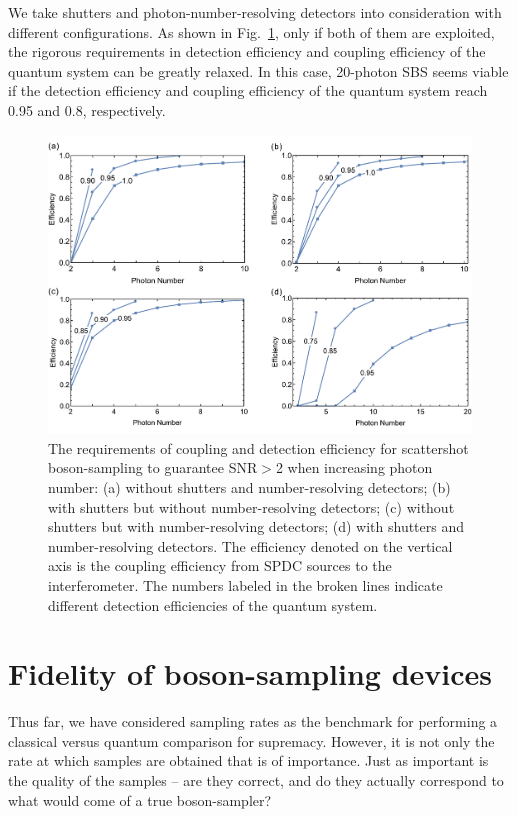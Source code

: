\documentclass[aps,rmp,twocolumn,amsmath,amssymb,nofootinbib,superscriptaddress]{revtex4}
\begin{document}
We take shutters and photon-number-resolving detectors into consideration with different configurations. As shown in Fig.~\ref{fig:SBS_eff}, only if both of them are exploited, the rigorous requirements in detection efficiency and coupling efficiency of the quantum system can be greatly relaxed. In this case, 20-photon SBS seems viable if the detection efficiency and coupling efficiency of the quantum system reach 0.95 and 0.8, respectively.

\begin{figure}[!htb]
\includegraphics[width=1.5\columnwidth]{SBS_eff}
\caption{The requirements of coupling and detection efficiency for scattershot boson-sampling to guarantee SNR$>$2 when increasing photon number: (a) without shutters and number-resolving detectors; (b) with shutters but without number-resolving detectors; (c) without shutters but with number-resolving detectors; (d) with shutters and number-resolving detectors. The efficiency denoted on the vertical axis is the coupling efficiency from SPDC sources to the interferometer. The numbers labeled in the broken lines indicate different detection efficiencies of the quantum system.} \label{fig:SBS_eff}
\end{figure}

\section{Fidelity of boson-sampling devices} \label{sec:fidelity_of_devices}

Thus far, we have considered sampling rates as the benchmark for performing a classical versus quantum comparison for supremacy. However, it is not only the rate at which samples are obtained that is of importance. Just as important is the quality of the samples -- are they correct, and do they actually correspond to what would come of a true boson-sampler?
\end{document}
